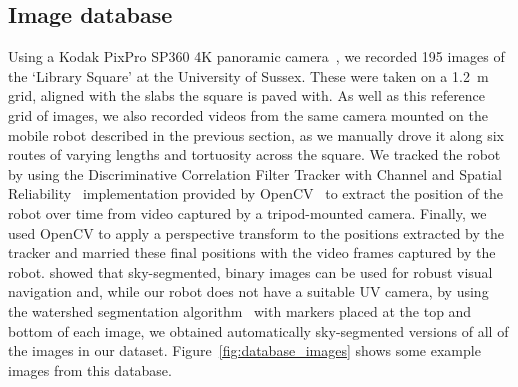 \documentclass[letterpaper]{article}
\begin{document}
\subsection{Image database}
\label{sec:image_database}
Using a Kodak PixPro SP360 4K panoramic camera~\citep{JKImagingLtd}, we recorded \num{195} images of the ‘Library Square’ at the University of Sussex. 
These were taken on a \SI{1.2}{\metre} grid, aligned with the slabs the square is paved with.
As well as this reference grid of images, we also recorded videos from the same camera mounted on the mobile robot described in the previous section, as we manually drove it along six routes of varying lengths and tortuosity across the square. 
We tracked the robot by using the Discriminative Correlation Filter Tracker with Channel and Spatial Reliability~\citep{Lukezic2018} implementation provided by OpenCV~\citep{OpenCV} to extract the position of the robot over time from video captured by a tripod-mounted camera. 
Finally, we used OpenCV to apply a perspective transform to the positions extracted by the tracker and married these final positions with the video frames captured by the robot. 
\citet{Stone2014} showed that sky-segmented, binary images can be used for robust visual navigation and, while our robot does not have a suitable UV camera, by using the watershed segmentation algorithm~\citep{Beucher1979} with markers placed at the top and bottom of each image, we obtained automatically sky-segmented versions of all of the images in our dataset.
Figure~\ref{fig:database_images} shows some example images from this database.
\end{document}
